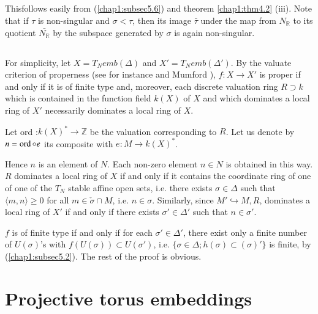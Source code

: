\subsection{} \label{chap1:subsec5.9}%
This\pageoriginale follows easily from (\ref{chap1:subsec5.6}) and
theorem \ref{chap1:thm4.2} 
(iii). Note that 
if $\tau$ is non-singular and $\sigma < \tau$, then its image
$\bar{\tau}$ under the map from $N_{\mathbb{R}}$ to its quotient
$\bar{N_{\mathbb{R}}}$ by the subspace generated by $\sigma$ is again
non-singular. 


 \subsection{}\label{chap1:subsec5.10}%
For simplicity, let $X= T_N emb (\Delta)$ and $X'= T_N emb
(\Delta')$. By the valuate criterion of properness (see for instance
\cite{keyEGA} and Mumford \cite{keyM8}), $f: X \to X'$ is proper if and only if it
is of finite type and, moreover, each discrete valuation ring $R
\supset k$ which is contained in the function field $k(X)$ of $X$ and
which dominates a local ring of $X'$ necessarily dominates a local
ring of $X$. 

 
 Let ord :$ k(X)^* \to \mathbb{Z}$ be the valuation corresponding to
 $R$. Let us denote by $n= \operatorname{ord} \circ e$ its composite with $  e : M \to
 k(X)^*$.  
 
 \noindent
 Hence $n$ is an element of $N$. Each non-zero element $n \in N$ is
 obtained in this way. $R$ dominates a local ring of $X$ if and only
 if it contains the coordinate ring of one of one of the $T_N$ stable
 affine open sets, i.e. there exists $\sigma \in \Delta$ such that $ \langle
 m,n \rangle \geq 0$ for all $ m \in \check{\sigma} \cap M$, i.e. $n \in
 \sigma$. Similarly, since $M' \hookrightarrow M, R$, dominates a
 local ring of $X'$ if and only if there exists $ \sigma' \in \Delta'$
 such that $n \in \sigma'$. 
 
 $f$ is of finite type if and only if for each  $ \sigma' \in
 \Delta'$, there exist only a finite number of $U(\sigma)$'s  with
 $f(U(\sigma))\subset U(\sigma')$, i.e. $\{ \sigma \in \Delta ;
 h(\sigma) \subset (\sigma)' \}$ is finite, by
 (\ref{chap1:subsec5.2}). The rest of 
 the proof is obvious. 
 

 \section{Projective torus embeddings}\label{chap1:sec6}
 
